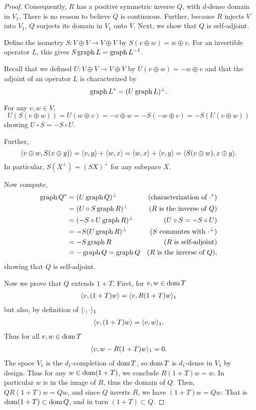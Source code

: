 \documentclass[11pt]{amsart}
\begin{document}
\begin{proof}
		Consequently, $R$ has a positive symmetric inverse $Q$, with $d$-dense domain in $V_1$.  There is no reason to believe $Q$ is continuous.  Further, because $R$ injects $V$ into $V_1$, $Q$ surjects its domain in $V_1$ onto $V$. Next, we show that $Q$ is self-adjoint.
		
			Define the isometry $S:V\oplus V \to V\oplus V$ by $S(v\oplus w)=w\oplus v$. For an invertible operator $L$, this gives $S\operatorname{graph} L =\operatorname{graph} L^{-1}$. 
		
		Recall that we defined $U:V\oplus V\to V\oplus V$ by $U(v\oplus w)=-w\oplus v$ and that the adjoint of an operator $L$ is characterized by
			\begin{equation*}
				\operatorname{graph} L^*=(U\operatorname{graph} L)^{\perp}.
			\end{equation*}	 
			
			For any $v,w\in V$, 
			\begin{equation*}
				U(S(v\oplus w))=U(w\oplus v)=-v \oplus w=-S(-w\oplus v)=-S(U(v\oplus w))
			\end{equation*}
		showing $U\circ S=-S\circ U$. 
		
		Further,
			\begin{equation*}
				\langle v\oplus w, S(x\oplus y) \rangle=\langle v, y \rangle+\langle w, x \rangle=\langle w, x \rangle+\langle v, y \rangle=\langle S(v\oplus w), x\oplus y \rangle.
			\end{equation*}
		In particular, $S(X^\perp)=(SX)^\perp$ for any subspace $X$. 
		
		Now compute,
			\begin{align*}
				\operatorname{graph} Q^* & = (U \operatorname{graph} Q )^{\perp}  & (\text{characterization of $\cdot^*$})\\
							& = (U \circ S \operatorname{graph} R)^\perp & (\text{$R$ is the inverse of $Q$})\\
							& = (-S\circ U \operatorname{graph} R)^\perp & (U\circ S=-S\circ U)\\
							& = -S(U\operatorname{graph} R)^\perp & (S \text{ commutes with } \cdot^\perp)\\
							& = -S \operatorname{graph} R & (R \text{ is self-adjoint})\\
							& = - \operatorname{graph} Q= \operatorname{graph} Q &(R \text{ is the inverse of } Q),
			\end{align*}
		showing that $Q$ is self-adjoint.
		
		Now we prove that $Q$ extends $1+T$.  First, for $v,w\in \operatorname{dom} T$
			\begin{align*}
				\langle v, (1+T)w \rangle=\langle v, R(1+T)w \rangle_1
			\end{align*}
		but also, by definition of $\langle \cdot, \cdot \rangle_1$
			\begin{align*}
				\langle v, (1+T)w \rangle=\langle v, w \rangle_1.
			\end{align*}
		Thus for all $v,w\in \operatorname{dom} T$ 
			\begin{align*}
				\langle v, w-R(1+T)w \rangle_1=0.
			\end{align*}		
		The space $V_1$ is the $d_1$-completion of $\operatorname{dom} T$, so $\operatorname{dom} T$ is $d_1$-dense in $V_1$ by design. Thus for any $w\in \operatorname{dom} (1+T)$, we conclude $R(1+T)w=w$. In particular $w$ is in the image of $R$, thus the domain of $Q$. Then, $QR(1+T)w=Qw$, and since $Q$ inverts $R$, we have $(1+T)w=Qw$. That is $\operatorname{dom} (1+T)\subset \operatorname{dom} Q$, and in turn $(1+T)\subset Q$.
		

\end{proof}
\end{document}
